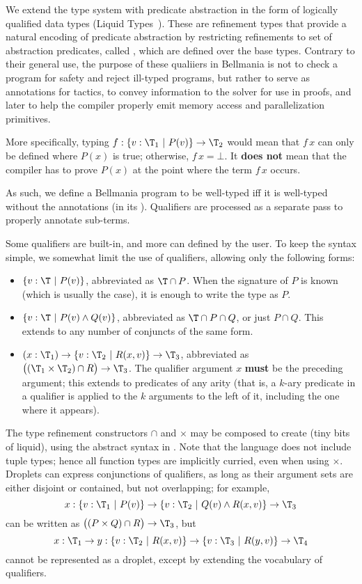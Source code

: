 \cbstart%
We extend the type system with predicate abstraction in the form of logically qualified data types 
(Liquid Types~\cite{PLDI08/Rondon}). 
These are refinement types that provide a natural encoding of predicate abstraction
by restricting refinements to set of abstraction predicates,
called , which are defined over the base types.
\cbend{}
Contrary to their general use, the purpose of these qualiiers in Bellmania is not to
check a program for safety and reject ill-typed programs, but rather to serve as annotations for
tactics, to convey information to the solver for use in proofs, and later to help the compiler
properly emit memory access and parallelization primitives.

More specifically, typing $f : \{v:\T_1 ~|~ P(v)\}\to\T_2$ would mean that $f\,x$
can only be defined where $P(x)$ is true; otherwise, $f\,x=\bot$. 
It {\bf does not} mean that the compiler has to prove $P(x)$ at the point where the term $f\,x$
occurs.

As such, we define a Bellmania program to be well-typed iff it is well-typed
without the annotations (in its ). Qualifiers are processed
as a separate pass to properly annotate sub-terms.

Some qualifiers are built-in, and more can defined by the user. To keep the syntax simple, we somewhat
limit the use of qualifiers, allowing only the following forms:

\begin{itemize}
  \item $\{v:\T ~|~ P(v)\}$, abbreviated as $\T\cap P$. When the signature of $P$ is known (which is
  usually the case), it is enough to write \cbstart the type as\cbend{} $P$.
  \item $\{v:\T ~|~ P(v)\land Q(v)\}$, abbreviated as $\T\cap P\cap Q$, or just $P\cap Q$. This extends
  to any number of conjuncts of the same form.
  \item $(x : \T_1) \to \{v:\T_2 ~|~ R(x,v)\} \to \T_3$, abbreviated as $\big((\T_1\times\T_2)\cap R\big)\to\T_3$.
  The qualifier argument $x$ {\bf must} be the preceding argument; this extends to predicates of
  any arity (that is, a $k$-ary predicate in a qualifier is applied to the $k$
  arguments to the left of it, including the one where it appears).
\end{itemize}


\medskip  
The type refinement constructors $\cap$ and $\times$ may be composed to create  \cbstart{}(tiny bits of liquid)\cbend,
using the abstract syntax in .
Note that the language does not include tuple types; hence all function types are
implicitly curried, even when using $\times$.
Droplets can express conjunctions of qualifiers,
as long as their argument sets are either disjoint or contained, but not overlapping;
for example, \[x:\{v:\T_1~|~P(v)\}\to \{v:\T_2~|~Q(v)\land R(x,v)\}\to\T_3\] can be written as
$\big((P\times Q)\cap R\big)\to\T_3$, but \[x:\T_1\to y:\{v:\T_2~|~R(x,v)\} \to \{v:\T_3~|~R(y,v)\}\to\T_4\]
cannot be represented as a droplet, except by extending the vocabulary of qualifiers.

